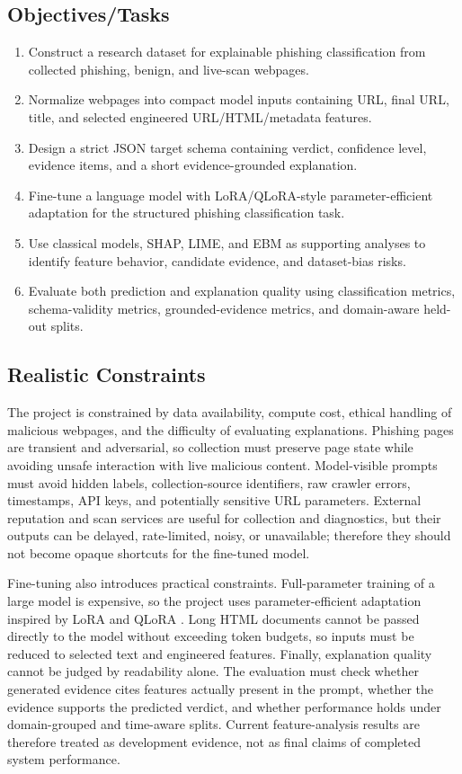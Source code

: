 \documentclass[12pt,letterpaper]{article}
\begin{document}
\subsection{Objectives/Tasks}
\begin{enumerate}
\item Construct a research dataset for explainable phishing classification from collected phishing, benign, and live-scan webpages.
\item Normalize webpages into compact model inputs containing URL, final URL, title, and selected engineered URL/HTML/metadata features.
\item Design a strict JSON target schema containing verdict, confidence level, evidence items, and a short evidence-grounded explanation.
\item Fine-tune a language model with LoRA/QLoRA-style parameter-efficient adaptation for the structured phishing classification task.
\item Use classical models, SHAP, LIME, and EBM as supporting analyses to identify feature behavior, candidate evidence, and dataset-bias risks.
\item Evaluate both prediction and explanation quality using classification metrics, schema-validity metrics, grounded-evidence metrics, and domain-aware held-out splits.
\end{enumerate}

\subsection{Realistic Constraints}
The project is constrained by data availability, compute cost, ethical handling of malicious webpages, and the difficulty of evaluating explanations. Phishing pages are transient and adversarial, so collection must preserve page state while avoiding unsafe interaction with live malicious content. Model-visible prompts must avoid hidden labels, collection-source identifiers, raw crawler errors, timestamps, API keys, and potentially sensitive URL parameters. External reputation and scan services are useful for collection and diagnostics, but their outputs can be delayed, rate-limited, noisy, or unavailable; therefore they should not become opaque shortcuts for the fine-tuned model.

Fine-tuning also introduces practical constraints. Full-parameter training of a large model is expensive, so the project uses parameter-efficient adaptation inspired by LoRA and QLoRA \cite{lora2021,qlora2023}. Long HTML documents cannot be passed directly to the model without exceeding token budgets, so inputs must be reduced to selected text and engineered features. Finally, explanation quality cannot be judged by readability alone. The evaluation must check whether generated evidence cites features actually present in the prompt, whether the evidence supports the predicted verdict, and whether performance holds under domain-grouped and time-aware splits. Current feature-analysis results are therefore treated as development evidence, not as final claims of completed system performance.
\end{document}
